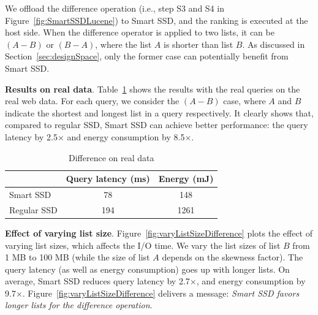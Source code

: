 We offload the \textsf{difference} operation (i.e., step S3 and S4 in Figure~\ref{fig:SmartSSDLucene}) to Smart SSD, and the ranking is executed at the host side. When the \textsf{difference} operator is applied to two lists, it can be $(A-B)$ or $(B-A)$, where the list $A$ is shorter than list $B$. As discussed in Section~\ref{sec:designSpace}, only the former case can potentially benefit from Smart SSD.



\textbf{Results on real data}.
Table~\ref{tab:diffRealData} shows the results with the real queries on the real web data. For each query, we consider the $(A-B)$ case, where $A$ and $B$ indicate the shortest and longest list in a query respectively. It clearly shows that, compared to regular SSD, Smart SSD can achieve better performance: the query latency by 2.5$\times$ and energy consumption by 8.5$\times$.

\begin{table}[tbp]\small
\centering
\begin{tabular}{l|c|c}\hline\hline
& \textbf{Query latency (ms)} & \textbf{Energy (mJ)}\\\hline
Smart SSD & 78 & 148\\\hline
Regular SSD & 194 & 1261 \\\hline\hline
\end{tabular}
\caption{Difference on real data}\label{tab:diffRealData}
\end{table}

\textbf{Effect of varying list size}.
Figure~\ref{fig:varyListSizeDifference} plots the effect of varying list sizes, which affects the I/O time.
We vary the list sizes of list $B$ from 1 MB to 100 MB (while the size of list $A$ depends on the skewness factor).
The query latency (as well as energy consumption) goes up with longer lists.
On average, Smart SSD reduces query latency by 2.7$\times$, and energy consumption by 9.7$\times$.
Figure~\ref{fig:varyListSizeDifference} delivers a message: \emph{Smart SSD favors longer lists for the \textsf{difference} operation}.

